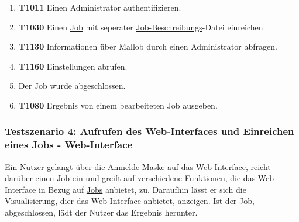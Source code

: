 \begin{enumerate}
        
    \item \textbf{T1011} Einen Administrator authentifizieren. 
    
    \item \textbf{T1030} Einen \hyperref[B:Jobs]{Job} mit seperater \hyperref[B:Job-Beschreibung]{Job-Beschreibungs}-Datei einreichen. 
    
    \item \textbf{T1130} Informationen über \gls{Mallob} durch einen \gls{Administrator} abfragen. 
    
    \item \textbf{T1160} Einstellungen abrufen.

    \item Der Job wurde abgeschlossen.
    
    \item \textbf{T1080} Ergebnis von einem bearbeiteten Job ausgeben. 
    
\end{enumerate}

\subsubsection{Testszenario 4: Aufrufen des Web-Interfaces und Einreichen eines Jobs - Web-Interface}
Ein \gls{Nutzer} gelangt über die Anmelde-Maske auf das \gls{Web-Interface}, reicht darüber einen \hyperref[B:Jobs]{Job} ein und greift auf verschiedene Funktionen, die das \gls{Web-Interface} in Bezug auf \hyperref[B:Jobs]{Jobs} anbietet, zu. Daraufhin lässt er sich die Visualisierung, dier das Web-Interface anbietet, anzeigen. Ist der Job, abgeschlossen, lädt der \gls{Nutzer} das Ergebnis herunter.


